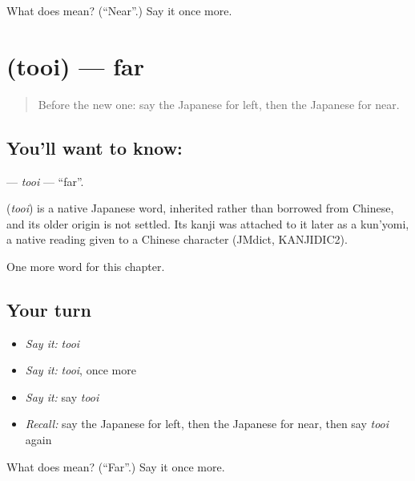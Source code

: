 \begin{tcolorbox}[breakable,colback=teal!4,colframe=teal!35!black,title={Before you move on}]
What does  mean? (\textquotedblleft{}Near\textquotedblright{}.) Say it once more.
\end{tcolorbox}
\section[\texorpdfstring{\ja{とおい} (tooi)}{とおい (tooi)}]{ (tooi) — far}

\label{lesson:JA-C57-tooi}



\begin{quote}
Before the new one: say the Japanese for left, then the Japanese for near.
\end{quote}

\subsection*{You'll want to know: }
\textbf{} — \emph{tooi} — \textquotedblleft{}far\textquotedblright{}.

\begin{cousinweb}
\textbf{} (\emph{tooi}) is a native Japanese word, inherited rather than borrowed from Chinese, and its older origin is not settled. Its kanji was attached to it later as a kun'yomi, a native reading given to a Chinese character (JMdict, KANJIDIC2).
\end{cousinweb}

\begin{grammarlens}[title={What you've built}]
One more word for this chapter.
\end{grammarlens}

\subsection*{Your turn}
\begin{itemize}
\raggedright
  \item \emph{Say it:} \emph{tooi}
  \item \emph{Say it:} \emph{tooi}, once more
  \item \emph{Say it:} say \emph{tooi}
  \item \emph{Recall:} say the Japanese for left, then the Japanese for near, then say \emph{tooi} again
\end{itemize}

\begin{tcolorbox}[breakable,colback=teal!4,colframe=teal!35!black,title={Before you move on}]
What does  mean? (\textquotedblleft{}Far\textquotedblright{}.) Say it once more.
\end{tcolorbox}
